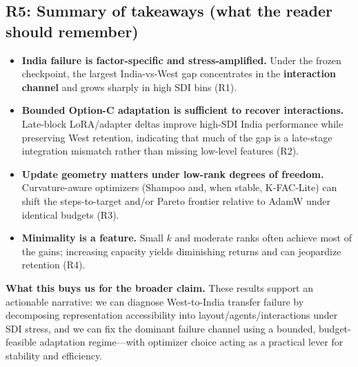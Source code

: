 \subsection{R5: Summary of takeaways (what the reader should remember)}
\label{sec:results_takeaways}

\begin{itemize}[leftmargin=*,itemsep=2pt]
\item \textbf{India failure is factor-specific and stress-amplified.} Under the frozen checkpoint, the largest India-vs-West gap concentrates in the \textbf{interaction channel} and grows sharply in high SDI bins (R1).
\item \textbf{Bounded Option-C adaptation is sufficient to recover interactions.} Late-block LoRA/adapter deltas improve high-SDI India performance while preserving West retention, indicating that much of the gap is a late-stage integration mismatch rather than missing low-level features (R2).
\item \textbf{Update geometry matters under low-rank degrees of freedom.} Curvature-aware optimizers (Shampoo and, when stable, K-FAC-Lite) can shift the steps-to-target and/or Pareto frontier relative to AdamW under identical budgets (R3).
\item \textbf{Minimality is a feature.} Small $k$ and moderate ranks often achieve most of the gains; increasing capacity yields diminishing returns and can jeopardize retention (R4).
\end{itemize}

\vspace{2pt}
\noindent\textbf{What this buys us for the broader claim.}
These results support an actionable narrative: we can diagnose West-to-India transfer failure by decomposing representation accessibility into layout/agents/interactions under SDI stress, and we can fix the dominant failure channel using a bounded, budget-feasible adaptation regime---with optimizer choice acting as a practical lever for stability and efficiency.


